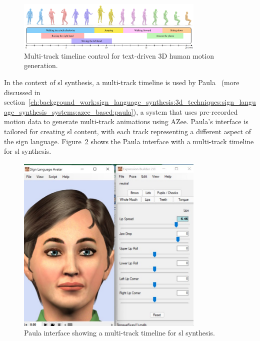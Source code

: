 \documentclass[../../main.tex]{subfiles}
\begin{document}
\begin{figure}
    \centering
    \includegraphics[width=0.8\textwidth]{chapters/multi_track/images/multi_track_other.png}
    \caption{Multi-track timeline control for text-driven 3D human motion generation.}
    \label{fig:multi_track_other}
\end{figure}

In the context of \gls{sl} synthesis, a multi-track timeline is used by Paula~\cite{filhol2017synthesizing} (more discussed in section~\ref{ch:background_work:sign_language_synthesis:3d_techniques:sign_language_synthesis_systems:azee_based:paula}), a system that uses pre-recorded motion data to generate multi-track animations using AZee. Paula's interface is tailored for creating \gls{sl} content, with each track representing a different aspect of the sign language. Figure~\ref{fig:paula} shows the Paula interface with a multi-track timeline for \gls{sl} synthesis.

\begin{figure}[h]
    \centering
    \includegraphics[width=0.8\textwidth]{chapters/multi_track/images/paula.png}
    \caption{Paula interface showing a multi-track timeline for \gls{sl} synthesis.}
    \label{fig:paula}
\end{figure}
\end{document}
